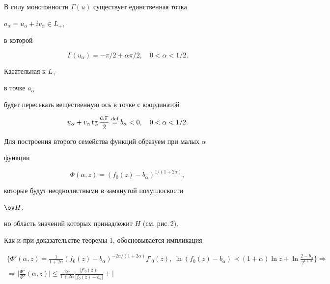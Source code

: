 \begin{pf}
В силу монотонности $\Gamma(u)$ существует единственная точка 


$a_\alpha=u_{\alpha}+iv_{\alpha} \in L_{+}$, 


в которой 


$$ 


\Gamma(u_\alpha)=-\pi/2+\alpha\pi/2,\quad 0<\alpha<1/2. 


$$ 


Касательная к $L_+$ 


в точке $a_\alpha$ 


будет пересекать вещественную ось в точке с координатой 


$$ 


u_\alpha+v_\alpha\tg\frac{\alpha\pi}{2} 


\overset{\text{def}}{=}{}b_\alpha<0,\quad 


0<\alpha<1/2. 


$$ 


 


Для построения второго семейства функций образуем при малых $\alpha$ 


функции 


\begin{equation} 


\Phi(\alpha,z)=(f_0(z)-b_\alpha)^{1/(1+2\alpha)}, 


\end{equation} 


которые будут неоднолистными в замкнутой полуплоскости 


$\ov H$, 


но область значений которых принадлежит $H$ (см. рис.\,2). 


Как и при доказательстве теоремы 1, обосновывается импликация 


\begin{multline} 


\bigg\{\Phi'(\alpha,z)=\frac{1}{1+2\alpha} 


(f_0(z)-b_\alpha)^{-2\alpha/(1+2\alpha)}f'_0(z),\  


\ln(f_0(z)-b_\alpha)\prec(1+\alpha)\ln z+\ln 


\frac{2-b_\alpha}{2^{1+\alpha}}\bigg\}\Longrightarrow\\ 


% 


\Longrightarrow\bigg|\frac{\Phi''}{\Phi'}(\alpha,z)\bigg|\le 


\frac{2\alpha}{1+2\alpha} 


\frac{|f'_0(z)|}{|f_0(z)-b_\alpha|}+\bigg| 



\end{multline}
\end{pf}
